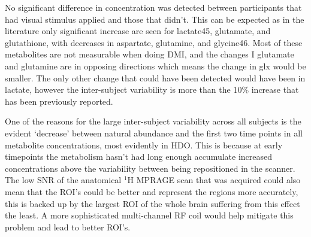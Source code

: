 \documentclass[class=article, crop=false]{standalone}
\begin{document}
No significant difference in concentration was detected between participants that had visual stimulus applied and those that didn’t. This can be expected as in the literature only significant increase are seen for lactate45, glutamate, and glutathione, with decreases in aspartate, glutamine, and glycine46. Most of these metabolites are not measurable when doing DMI, and the changes I glutamate and glutamine are in opposing directions which means the change in glx would be smaller. The only other change that could have been detected would have been in lactate, however the inter-subject variability is more than the 10\% increase that has been previously reported.


One of the reasons for the large inter-subject variability across all subjects is the evident ‘decrease’ between natural abundance and the first two time points in all metabolite concentrations, most evidently in HDO. This is because at early timepoints the metabolism hasn’t had long enough accumulate increased concentrations above the variability between being repositioned in the scanner. The low SNR of the anatomical $^1$H MPRAGE scan that was acquired could also mean that the ROI’s could be better and represent the regions more accurately, this is backed up by the largest ROI of the whole brain suffering from this effect the least. A more sophisticated multi-channel RF coil would help mitigate this problem and lead to better ROI’s.

\end{document}
